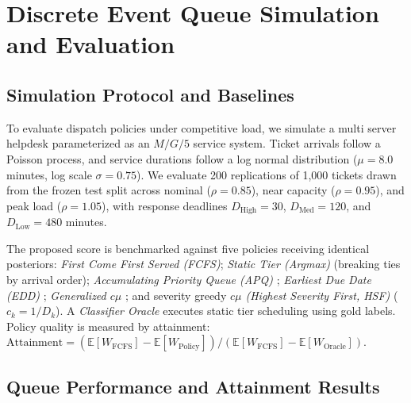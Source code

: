 \section{Discrete Event Queue Simulation and Evaluation}
\label{sec:evaluation}

\subsection{Simulation Protocol and Baselines}

To evaluate dispatch policies under competitive load, we simulate a multi server helpdesk parameterized as an $M/G/5$ service system. Ticket arrivals follow a Poisson process, and service durations follow a log normal distribution ($\mu = 8.0$ minutes, log scale $\sigma = 0.75$). We evaluate 200 replications of 1{,}000 tickets drawn from the frozen test split across nominal ($\rho = 0.85$), near capacity ($\rho = 0.95$), and peak load ($\rho = 1.05$), with response deadlines $D_{\mathrm{High}} = 30$, $D_{\mathrm{Med}} = 120$, and $D_{\mathrm{Low}} = 480$ minutes.

The proposed score is benchmarked against five policies receiving identical posteriors: \emph{First Come First Served (FCFS)}; \emph{Static Tier (Argmax)} (breaking ties by arrival order); \emph{Accumulating Priority Queue (APQ)} \cite{stanford2014accumulating}; \emph{Earliest Due Date (EDD)} \cite{jackson1955scheduling}; \emph{Generalized $c\mu$} \cite{vanmieghem1995generalized}; and severity greedy \emph{$c\mu$ (Highest Severity First, HSF)} \cite{cox1961queues} ($c_k = 1/D_k$). A \emph{Classifier Oracle} executes static tier scheduling using gold labels. Policy quality is measured by attainment:
$\mathrm{Attainment} = (\mathbb{E}[W_{\mathrm{FCFS}}] - \mathbb{E}[W_{\mathrm{Policy}}]) / (\mathbb{E}[W_{\mathrm{FCFS}}] - \mathbb{E}[W_{\mathrm{Oracle}}])$.

\subsection{Queue Performance and Attainment Results}


